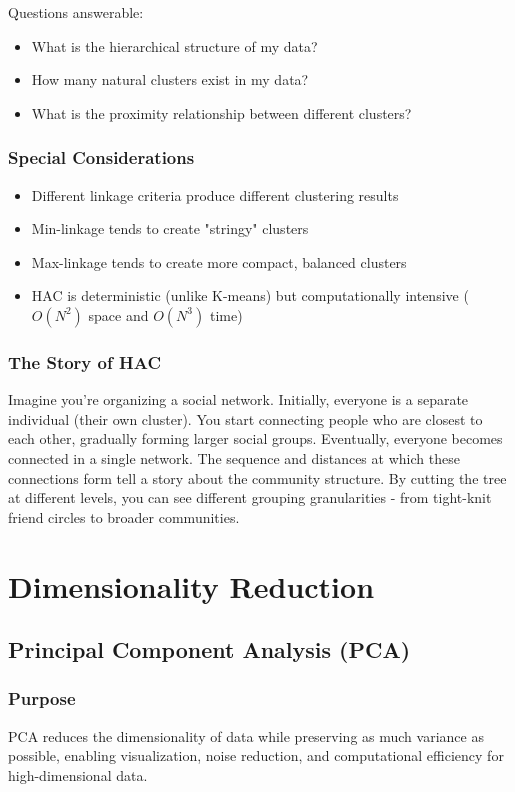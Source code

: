 \documentclass{article}
\begin{document}
Questions answerable:
\begin{itemize}
    \item What is the hierarchical structure of my data?
    \item How many natural clusters exist in my data?
    \item What is the proximity relationship between different clusters?
\end{itemize}

\subsubsection{Special Considerations}
\begin{itemize}
    \item Different linkage criteria produce different clustering results
    \item Min-linkage tends to create "stringy" clusters
    \item Max-linkage tends to create more compact, balanced clusters
    \item HAC is deterministic (unlike K-means) but computationally intensive ($O(N^2)$ space and $O(N^3)$ time)
\end{itemize}

\subsubsection{The Story of HAC}
Imagine you're organizing a social network. Initially, everyone is a separate individual (their own cluster). You start connecting people who are closest to each other, gradually forming larger social groups. Eventually, everyone becomes connected in a single network. The sequence and distances at which these connections form tell a story about the community structure. By cutting the tree at different levels, you can see different grouping granularities - from tight-knit friend circles to broader communities.

\section{Dimensionality Reduction}

\subsection{Principal Component Analysis (PCA)}

\subsubsection{Purpose}
PCA reduces the dimensionality of data while preserving as much variance as possible, enabling visualization, noise reduction, and computational efficiency for high-dimensional data.
\end{document}
